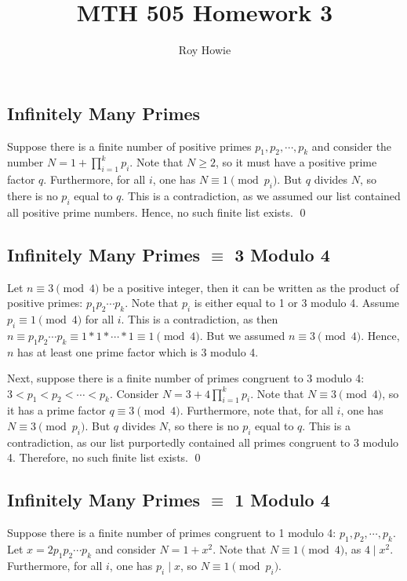 \documentclass{article}
\begin{document}
\title{\vspace{-3cm}MTH 505 Homework 3}
\author{Roy Howie}
\maketitle

\subsection{Infinitely Many Primes}
  Suppose there is a finite number of positive primes $p_1,p_2,\cdots,p_k$ and
  consider the number $N=1+\prod_{i=1}^k{p_i}$. Note that $N\ge2$, so it must
  have a positive prime factor $q$. Furthermore, for all $i$, one has $N\equiv1
  \pmod{p_i}$. But $q$ divides $N$, so there is no $p_i$ equal to $q$. This is a
  contradiction, as we assumed our list contained all positive prime numbers.
  Hence, no such finite list exists.
  \qed

\subsection{Infinitely Many Primes $\equiv$ 3 Modulo 4}
  Let $n\equiv3\pmod{4}$ be a positive integer, then it can be written as the
  product of positive primes: $p_1p_2\cdots p_k$. Note that $p_i$ is either
  equal to 1 or 3 modulo 4. Assume $p_i\equiv1\pmod{4}$ for all $i$. This is a
  contradiction, as then $n\equiv p_1p_2\cdots p_k\equiv1*1*\cdots
  *1\equiv1\pmod{4}$. But we assumed $n\equiv3\pmod{4}$. Hence, $n$ has at least
  one prime factor which is 3 modulo 4.

  Next, suppose there is a finite number of primes congruent to 3 modulo 4: $3<
  p_1 <p_2<\cdots<p_k$. Consider $N=3+4\prod_{i=1}^k{p_i}$. Note that $N\equiv3
  \pmod{4}$, so it has a prime factor $q\equiv3\pmod{4}$. Furthermore, note
  that, for all $i$, one has $N\equiv3\pmod{p_i}$. But $q$ divides $N$, so there
  is no $p_i$ equal to $q$. This is a contradiction, as our list purportedly
  contained all primes congruent to 3 modulo 4. Therefore, no such finite list
  exists.
  \qed

\subsection{Infinitely Many Primes $\equiv$ 1 Modulo 4}
  Suppose there is a finite number of primes congruent to 1 modulo 4: $p_1,p_2,
  \cdots,p_k$. Let $x=2p_1p_2\cdots p_k$ and consider $N=1+x^2$. Note that $N
  \equiv1\pmod{4}$, as $4\mid x^2$. Furthermore, for all $i$, one has $p_i\mid
  x$, so $N\equiv1\pmod{p_i}$.
\end{document}
